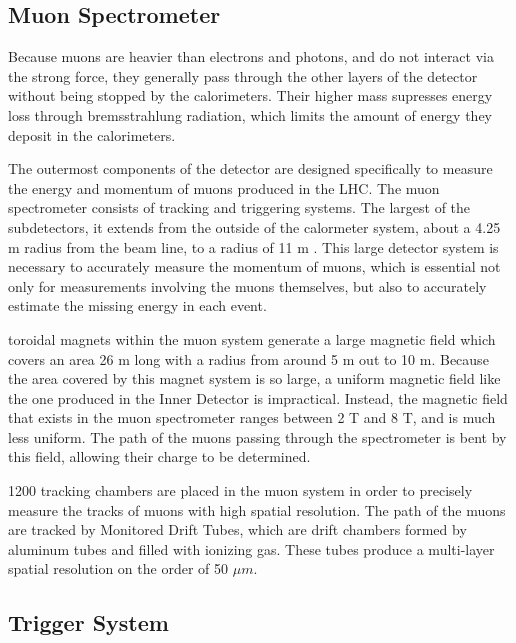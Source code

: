\subsection{Muon Spectrometer}
\label{sec:muonSpec}

Because muons are heavier than electrons and photons, and do not interact via the strong force, they generally pass through the other layers of the detector without being stopped by the calorimeters. Their higher mass supresses energy loss through bremsstrahlung radiation, which limits the amount of energy they deposit in the calorimeters. 

The outermost components of the detector are designed specifically to measure the energy and momentum of muons produced in the LHC. The muon spectrometer consists of tracking and triggering systems. The largest of the subdetectors, it extends from the outside of the calormeter system, about a 4.25 m radius from the beam line, to a radius of 11 m \cite{MUON-2010-01}. This large detector system is necessary to accurately measure the momentum of muons, which is essential not only for measurements involving the muons themselves, but also to accurately estimate the missing energy in each event.

 toroidal magnets within the muon system generate a large magnetic field which covers an area 26 m long with a radius from around 5 m out to 10 m. Because the area covered by this magnet system is so large, a uniform magnetic field like the one produced in the Inner Detector is impractical. Instead, the magnetic field that exists in the muon spectrometer ranges between 2 T and 8 T, and is much less uniform. The path of the muons passing through the spectrometer is bent by this field, allowing their charge to be determined. 

1200 tracking chambers are placed in the muon system in order to precisely measure the tracks of muons with high spatial resolution. The path of the muons are tracked by Monitored Drift Tubes, which are drift chambers formed by aluminum tubes and filled with ionizing gas. These tubes produce a multi-layer spatial resolution on the order of 50 $\mu m$.


\subsection{Trigger System}
\label{sec:trigger}

